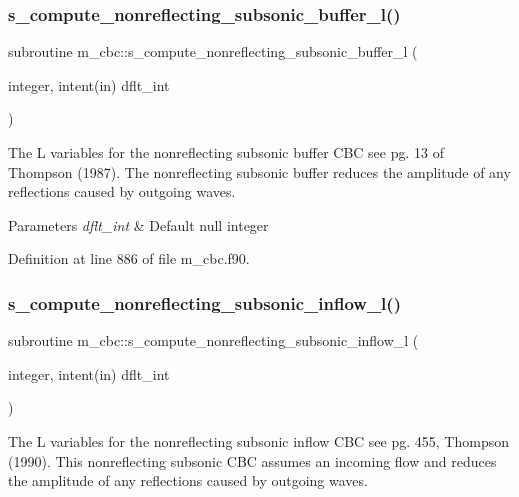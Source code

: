 \subsubsection{\texorpdfstring{s\+\_\+compute\+\_\+nonreflecting\+\_\+subsonic\+\_\+buffer\+\_\+l()}{s\_compute\_nonreflecting\_subsonic\_buffer\_l()}}
{\footnotesize\ttfamily subroutine m\+\_\+cbc\+::s\+\_\+compute\+\_\+nonreflecting\+\_\+subsonic\+\_\+buffer\+\_\+l (\begin{DoxyParamCaption}\item[{integer, intent(in)}]{dflt\+\_\+int }\end{DoxyParamCaption})}



The L variables for the nonreflecting subsonic buffer C\+BC see pg. 13 of Thompson (1987). The nonreflecting subsonic buffer reduces the amplitude of any reflections caused by outgoing waves. 


\begin{DoxyParams}{Parameters}
{\em dflt\+\_\+int} & Default null integer \\
\hline
\end{DoxyParams}


Definition at line 886 of file m\+\_\+cbc.\+f90.

\mbox{\label{namespacem__cbc_aaaa6698b1ae1671a9124bb22617b4b8c}} 
\subsubsection{\texorpdfstring{s\+\_\+compute\+\_\+nonreflecting\+\_\+subsonic\+\_\+inflow\+\_\+l()}{s\_compute\_nonreflecting\_subsonic\_inflow\_l()}}
{\footnotesize\ttfamily subroutine m\+\_\+cbc\+::s\+\_\+compute\+\_\+nonreflecting\+\_\+subsonic\+\_\+inflow\+\_\+l (\begin{DoxyParamCaption}\item[{integer, intent(in)}]{dflt\+\_\+int }\end{DoxyParamCaption})}



The L variables for the nonreflecting subsonic inflow C\+BC see pg. 455, Thompson (1990). This nonreflecting subsonic C\+BC assumes an incoming flow and reduces the amplitude of any reflections caused by outgoing waves. 



